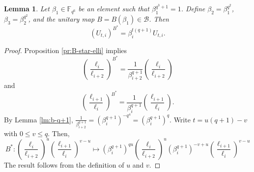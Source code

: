 \documentclass[a4paper]{amsart}
\theoremstyle{plain}
\newtheorem{lemma}[theorem]{Lemma}
\theoremstyle{definition}
\theoremstyle{remark}
\begin{document}
\begin{lemma} \label{lm:B-start-on-U}
Let $\beta_1 \in \mathbb{F}_{q^6}$ be an element such that $\beta_1^{q^3+1}=1$. Define $\beta_2=\beta_1^{q^2}$, $\beta_3=\beta_2^{q^2}$, and the unitary map $B=B(\beta_1) \in \mathcal{B}$. Then
\[(U_{t,i})^{B^*} = \beta_i^{t(q+1)} U_{t,i}.\]
\end{lemma}
\begin{proof}
Proposition \ref{pr:B-star-elli} implies
\[\left(\frac{\ell_i}{\ell_{i+2}}\right)^{B^*} = \frac{1}{\beta_{i+2}^{q+1}}\left(\frac{\ell_i}{\ell_{i+2}}\right)\]
and
\[\left(\frac{\ell_{i+1}}{\ell_{i}}\right)^{B^*} = \frac{1}{\beta_{i}^{q+1}}
\left(\frac{\ell_{i+1}}{\ell_{i}}\right).\]
By Lemma \ref{lm:b-q+1}, $\frac{1}{\beta_{i+2}^{q+1}} = (\beta_{i}^{q+1})^{-q^4} = (\beta_{i}^{q+1})^{q}$. Write $t=u(q+1)-v$ with $0\leq v\leq q$. Then, 
\[B^*: \left(\frac{\ell_i}{\ell_{i+2}}\right)^u\left(\frac{\ell_{i+1}}{\ell_i}\right)^{v-u} \mapsto (\beta_i^{q+1})^{qu}  \left(\frac{\ell_i}{\ell_{i+2}}\right)^u (\beta_{i}^{q+1})^{-v+u} \left(\frac{\ell_{i+1}}{\ell_i}\right)^{v-u}\]
The result follows from the definition of $u$ and $v$. 
\end{proof}
\end{document}
